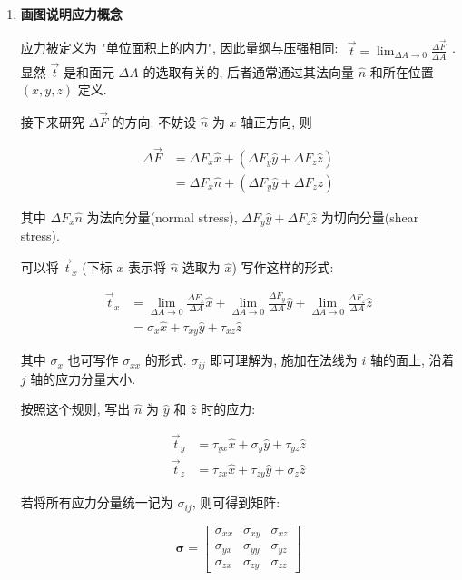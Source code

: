 \documentclass[../../main.tex]{subfiles}
\begin{document}
\begin{enumerate}
    \item \textbf{画图说明应力概念}
    
应力被定义为 "单位面积上的内力", 因此量纲与压强相同: $\begin{aligned}\vec{t} = \lim_{\Delta A\to 0}\frac{\Delta\vec{F}}{\Delta A}\end{aligned}$. 显然 $\vec{t}$ 是和面元 $\Delta A$ 的选取有关的, 后者通常通过其法向量 $\hat{n}$ 和所在位置 $(x,y,z)$ 定义. 

接下来研究 $\Delta\vec{F}$ 的方向. 不妨设 $\hat{n}$ 为 $x$ 轴正方向, 则

$$
\begin{aligned}
\Delta\vec{F} &= \Delta F_{x}\hat{x} + (\Delta F_{y}\hat{y} + \Delta F_{z}\hat{z})\\
&= \Delta F_{x}\hat{n} + (\Delta F_{y}\hat{y} + \Delta F_{z}\hat{z})
\end{aligned}
$$

其中 $\Delta F_{x}\hat{n}$ 为法向分量(normal stress), $\Delta F_{y}\hat{y} + \Delta F_{z}\hat{z}$ 为切向分量(shear stress). 

可以将 $\vec{t}_{x}$ (下标 $x$ 表示将 $\hat{n}$ 选取为 $\hat{x}$) 写作这样的形式: 

$$
\begin{aligned}
\vec{t}_{x} &= \lim_{\Delta A\to 0}\frac{\Delta F_{x}}{\Delta A}\hat{x} + \lim_{\Delta A\to 0}\frac{\Delta F_{y}}{\Delta A}\hat{y} + \lim_{\Delta A\to 0}\frac{\Delta F_{z}}{\Delta A}\hat{z}\\
&= \sigma_{x}\hat{x} + \tau_{xy}\hat{y} + \tau_{xz}\hat{z}
\end{aligned}
$$

其中 $\sigma_{x}$ 也可写作 $\sigma_{xx}$ 的形式. $\sigma_{ij}$ 即可理解为, 施加在法线为 $i$ 轴的面上, 沿着 $j$ 轴的应力分量大小. 


按照这个规则, 写出 $\hat{n}$ 为 $\hat{y}$ 和 $\hat{z}$ 时的应力: 

$$
\begin{aligned}
\vec{t}_{y} &= \tau_{yx}\hat{x} + \sigma_{y}\hat{y} + \tau_{yz}\hat{z}\\
\vec{t}_{z} &= \tau_{zx}\hat{x} + \tau_{zy}\hat{y} + \sigma_{z}\hat{z}
\end{aligned}
$$

若将所有应力分量统一记为 $\sigma_{ij}$, 则可得到矩阵:

$$
\mathbf{\sigma} = \begin{bmatrix}
\sigma_{xx} & \sigma_{xy} & \sigma_{xz}\\
\sigma_{yx} & \sigma_{yy} & \sigma_{yz}\\
\sigma_{zx} & \sigma_{zy} & \sigma_{zz}
\end{bmatrix}
$$


\end{enumerate}
\end{document}
